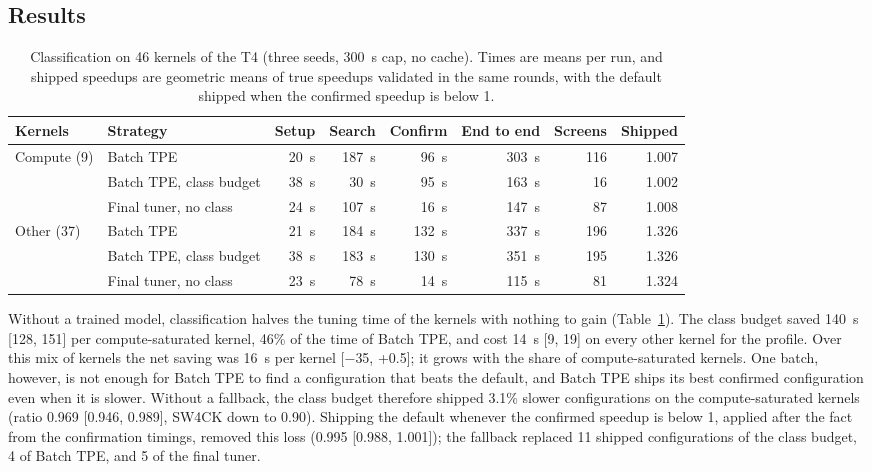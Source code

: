 \documentclass[10pt]{article}
\begin{document}
\subsection{Results}
\begin{table}[t]
\centering
\caption{Classification on 46 kernels of the T4 (three seeds, 300~s cap, no
cache). Times are means per run, and shipped speedups are geometric means of
true speedups validated in the same rounds, with the default shipped when the
confirmed speedup is below 1.}
\label{tab:coldstart}
\small
\begin{tabular}{llrrrrrr}
\toprule
Kernels & Strategy & Setup & Search & Confirm & End to end & Screens & Shipped \\
\midrule
Compute (9) & Batch TPE & 20~s & 187~s & 96~s & 303~s & 116 & 1.007 \\
 & Batch TPE, class budget & 38~s & 30~s & 95~s & 163~s & 16 & 1.002 \\
 & Final tuner, no class & 24~s & 107~s & 16~s & 147~s & 87 & 1.008 \\
\midrule
Other (37) & Batch TPE & 21~s & 184~s & 132~s & 337~s & 196 & 1.326 \\
 & Batch TPE, class budget & 38~s & 183~s & 130~s & 351~s & 195 & 1.326 \\
 & Final tuner, no class & 23~s & 78~s & 14~s & 115~s & 81 & 1.324 \\
\bottomrule
\end{tabular}
\end{table}

Without a trained model, classification halves the tuning time of the kernels
with nothing to gain (Table~\ref{tab:coldstart}). The class budget saved 140~s
[128, 151] per compute-saturated kernel, 46\% of the time of Batch TPE, and cost
14~s [9, 19] on every other kernel for the profile. Over this mix of kernels the
net saving was 16~s per kernel [$-$35, +0.5]; it grows with the share of
compute-saturated kernels. One batch, however, is not enough for Batch TPE to
find a configuration that beats the default, and Batch TPE ships its best
confirmed configuration even when it is slower. Without a fallback, the class
budget therefore shipped 3.1\% slower configurations on the compute-saturated
kernels (ratio 0.969 [0.946, 0.989], SW4CK down to 0.90). Shipping the default
whenever the confirmed speedup is below 1, applied after the fact from the
confirmation timings, removed this loss (0.995 [0.988, 1.001]); the fallback
replaced 11 shipped configurations of the class budget, 4 of Batch TPE, and 5
of the final tuner.
\end{document}
